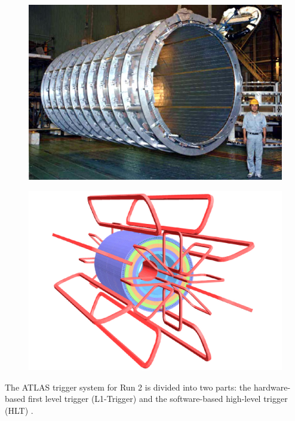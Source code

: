 \begin{figure}
\centering
\begin{minipage}{0.5\textwidth}
  \centering
  \includegraphics[width=0.7\linewidth]{images/image_solenoid_magnets.jpg}
  \label{magnet_sol}
\end{minipage}%
\begin{minipage}{0.5\textwidth}
  \centering
  \includegraphics[width=1.0\linewidth]{images/image_toroid_magnets.png}
  \label{magnets_tor}
\end{minipage}
\end{figure}

The ATLAS trigger system for Run 2 is divided into two parts: the hardware-based first level trigger (L1-Trigger) \cite{l1_trigger} and the software-based high-level trigger (HLT) \cite{hlt}.

